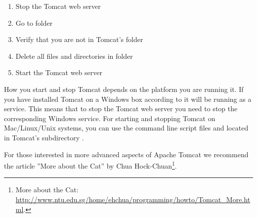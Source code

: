 \documentclass[a4paper,10pt,twoside]{book}
\begin{document}
\begin{enumerate}
  \item Stop the Tomcat web server
  \item Go to folder 
  \item Verify that you are not in Tomcat's  folder
  \item Delete all files and directories in folder 
  \item Start the Tomcat web server
\end{enumerate}

How you start and stop Tomcat depends on the platform you are running it. 
If you have installed Tomcat on a Windows box according to  it will be running as a service.
This means that to stop the Tomcat web server you need to stop the corresponding Windows service.
For starting and stopping Tomcat on Mac/Linux/Unix systems, you can use the command line script files  and  located in Tomcat's subdirectory .

For those interested in more advanced aspects of Apache Tomcat we recommend the article ''More about the Cat'' by Chua Hock-Chuan\footnote{
More about the Cat: \url{http://www.ntu.edu.sg/home/ehchua/programming/howto/Tomcat_More.html}.
}.


\ifx\wholebook\relax\else
   
   
\end{document}
